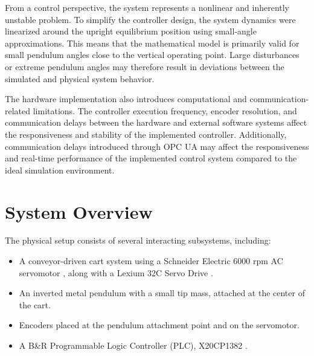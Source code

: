 From a control perspective, the system represents a nonlinear and inherently unstable problem. To simplify the controller design, the system dynamics were linearized around the upright equilibrium position using small-angle approximations. This means that the mathematical model is primarily valid for small pendulum angles close to the vertical operating point. Large disturbances or extreme pendulum angles may therefore result in deviations between the simulated and physical system behavior.

The hardware implementation also introduces computational and communication-related limitations. The controller execution frequency, encoder resolution, and communication delays between the hardware and external software systems affect the responsiveness and stability of the implemented controller. Additionally, communication delays introduced through OPC UA may affect the responsiveness and real-time performance of the implemented control system compared to the ideal simulation environment.


\section{System Overview}

The physical setup consists of several interacting subsystems, including:

\begin{itemize}
	\item A conveyor-driven cart system using a Schneider Electric 6000 rpm AC servomotor \cite{Servomotor}, along with a Lexium 32C Servo Drive \cite{Servo Drive}.
	\item An inverted metal pendulum with a small tip mass, attached at the center of the cart.
	\item Encoders placed at the pendulum attachment point and on the servomotor.
	\item A B\&R Programmable Logic Controller (PLC), X20CP1382 \cite{PLC}.
\end{itemize}

